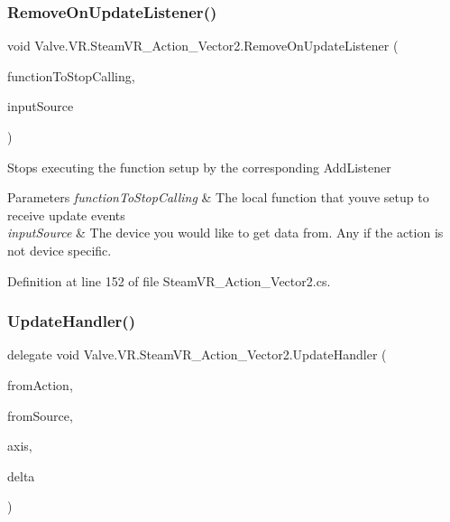 \subsubsection{\texorpdfstring{RemoveOnUpdateListener()}{RemoveOnUpdateListener()}}
{\footnotesize\ttfamily void Valve.\+V\+R.\+Steam\+V\+R\+\_\+\+Action\+\_\+\+Vector2.\+Remove\+On\+Update\+Listener (\begin{DoxyParamCaption}\item[{\mbox{\hyperlink{class_valve_1_1_v_r_1_1_steam_v_r___action___vector2_a3f6872fd8960cbb9f571b0362857d9b5}{Update\+Handler}}}]{function\+To\+Stop\+Calling,  }\item[{\mbox{\hyperlink{namespace_valve_1_1_v_r_a82e5bf501cc3aa155444ee3f0662853f}{Steam\+V\+R\+\_\+\+Input\+\_\+\+Sources}}}]{input\+Source }\end{DoxyParamCaption})}



Stops executing the function setup by the corresponding Add\+Listener 


\begin{DoxyParams}{Parameters}
{\em function\+To\+Stop\+Calling} & The local function that you\textquotesingle{}ve setup to receive update events\\
\hline
{\em input\+Source} & The device you would like to get data from. Any if the action is not device specific.\\
\hline
\end{DoxyParams}


Definition at line 152 of file Steam\+V\+R\+\_\+\+Action\+\_\+\+Vector2.\+cs.

\mbox{\label{class_valve_1_1_v_r_1_1_steam_v_r___action___vector2_a3f6872fd8960cbb9f571b0362857d9b5}} 
\subsubsection{\texorpdfstring{UpdateHandler()}{UpdateHandler()}}
{\footnotesize\ttfamily delegate void Valve.\+V\+R.\+Steam\+V\+R\+\_\+\+Action\+\_\+\+Vector2.\+Update\+Handler (\begin{DoxyParamCaption}\item[{\mbox{\hyperlink{class_valve_1_1_v_r_1_1_steam_v_r___action___vector2}{Steam\+V\+R\+\_\+\+Action\+\_\+\+Vector2}}}]{from\+Action,  }\item[{\mbox{\hyperlink{namespace_valve_1_1_v_r_a82e5bf501cc3aa155444ee3f0662853f}{Steam\+V\+R\+\_\+\+Input\+\_\+\+Sources}}}]{from\+Source,  }\item[{Vector2}]{axis,  }\item[{Vector2}]{delta }\end{DoxyParamCaption})}



